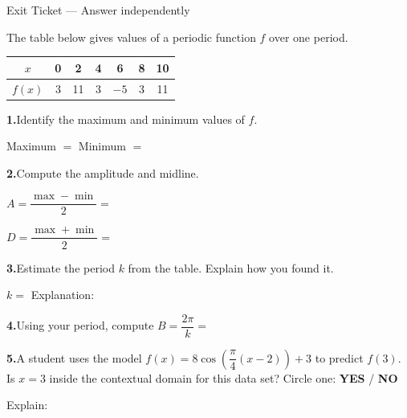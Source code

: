 \documentclass[10pt]{article}
\begin{document}
\namedateperiod

\vspace{0.12in}

\begin{notesbox}{Exit Ticket --- Answer independently}

The table below gives values of a periodic function $f$ over one period.

\vspace{6pt}
\begin{center}
\renewcommand{\arraystretch}{1.4}
\begin{tabular}{|c|c|c|c|c|c|c|}
\hline
$x$ & 0 & 2 & 4 & 6 & 8 & 10 \\
\hline
$f(x)$ & 3 & 11 & 3 & $-5$ & 3 & 11 \\
\hline
\end{tabular}
\end{center}

\vspace{8pt}
\textbf{1.}\quad Identify the maximum and minimum values of $f$.

Maximum $= $ \underline{\hspace{2cm}} \qquad Minimum $= $ \underline{\hspace{2cm}}

\vspace{8pt}
\textbf{2.}\quad Compute the amplitude and midline.

$A = \dfrac{\max - \min}{2} = $ \underline{\hspace{3.5cm}}

\vspace{4pt}
$D = \dfrac{\max + \min}{2} = $ \underline{\hspace{3.5cm}}

\vspace{8pt}
\textbf{3.}\quad Estimate the period $k$ from the table. Explain how you found it.

$k = $ \underline{\hspace{2cm}} \quad Explanation: \writeline

\vspace{8pt}
\textbf{4.}\quad Using your period, compute $B = \dfrac{2\pi}{k} = $ \underline{\hspace{3.5cm}}

\vspace{8pt}
\textbf{5.}\quad A student uses the model $f(x) = 8\cos\!\left(\dfrac{\pi}{4}(x - 2)\right) + 3$
to predict $f(3)$. Is $x = 3$ inside the contextual domain for this data set?
Circle one: \quad \textbf{YES} \quad / \quad \textbf{NO}

\vspace{4pt}
Explain: 

\end{notesbox}
\end{document}
